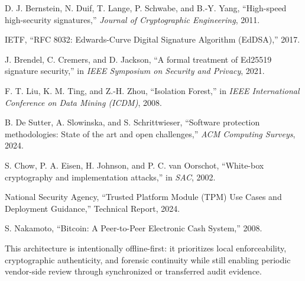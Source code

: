 \documentclass[11pt,a4paper]{article}
\begin{document}
\begin{enumerate}[label={[\arabic*]}]
\item D. J. Bernstein, N. Duif, T. Lange, P. Schwabe, and B.-Y. Yang, ``High-speed high-security signatures,'' \emph{Journal of Cryptographic Engineering}, 2011.
\item IETF, ``RFC 8032: Edwards-Curve Digital Signature Algorithm (EdDSA),'' 2017.
\item J. Brendel, C. Cremers, and D. Jackson, ``A formal treatment of Ed25519 signature security,'' in \emph{IEEE Symposium on Security and Privacy}, 2021.
\item F. T. Liu, K. M. Ting, and Z.-H. Zhou, ``Isolation Forest,'' in \emph{IEEE International Conference on Data Mining (ICDM)}, 2008.
\item B. De Sutter, A. Slowinska, and S. Schrittwieser, ``Software protection methodologies: State of the art and open challenges,'' \emph{ACM Computing Surveys}, 2024.
\item S. Chow, P. A. Eisen, H. Johnson, and P. C. van Oorschot, ``White-box cryptography and implementation attacks,'' in \emph{SAC}, 2002.
\item National Security Agency, ``Trusted Platform Module (TPM) Use Cases and Deployment Guidance,'' Technical Report, 2024.
\item S. Nakamoto, ``Bitcoin: A Peer-to-Peer Electronic Cash System,'' 2008.
\end{enumerate}

\begin{tcolorbox}[certicallout,title=\textbf{Final Note}]
This architecture is intentionally offline-first: it prioritizes local enforceability, cryptographic authenticity, and forensic continuity while still enabling periodic vendor-side review through synchronized or transferred audit evidence.
\end{tcolorbox}
\end{document}
